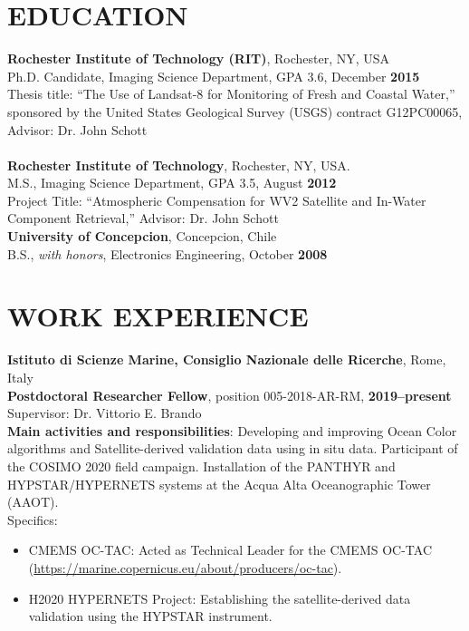\documentclass[11pt]{res}
\begin{document}
\begin{resume}
\vspace{-0.3in}                                         
\section{EDUCATION}
\vspace{0.1in}
{\bf Rochester Institute of Technology (RIT)}, Rochester, NY, USA\\
Ph.D. Candidate, Imaging Science Department, GPA 3.6, December {\bf 2015}\\
Thesis title: ``The Use of Landsat-8 for Monitoring of Fresh and Coastal Water,'' sponsored by the United States Geological Survey (USGS) contract G12PC00065, Advisor: Dr. John Schott\\
\vspace{0.1in}\\
{\bf Rochester Institute of Technology}, Rochester, NY, USA.\\
M.S., Imaging Science Department, GPA 3.5, August {\bf 2012}\\
Project Title: ``Atmospheric Compensation for WV2 Satellite and In-Water Component Retrieval,'' Advisor: Dr. John Schott
\vspace{0.1in}\\
{\bf University of Concepcion}, Concepcion, Chile \\
B.S., {\it with honors}, Electronics Engineering, October {\bf 2008}\\
\vspace{-0.1in}
\section{WORK EXPERIENCE}
\vspace{0.1in}
{\bf Istituto di Scienze Marine, Consiglio Nazionale delle Ricerche}, Rome, Italy\\
{\bf Postdoctoral Researcher Fellow}, position 005-2018-AR-RM, {\bf 2019--present}\\
Supervisor: Dr. Vittorio E. Brando\\
{\bf Main activities and responsibilities}: Developing and improving Ocean Color algorithms and Satellite-derived validation data using in situ data. Participant of the COSIMO 2020 field campaign. Installation of the PANTHYR and HYPSTAR\textsuperscript{\tiny\textregistered}/HYPERNETS systems at the Acqua Alta Oceanographic Tower (AAOT).\\
Specifics:
\begin{itemize}\setlength\itemsep{0em}
\item CMEMS OC-TAC: Acted as Technical Leader for the CMEMS OC-TAC (\url{https://marine.copernicus.eu/about/producers/oc-tac}).
\item H2020 HYPERNETS Project: Establishing the satellite-derived data validation using the HYPSTAR\textsuperscript{\tiny\textregistered} instrument.
\end{itemize}


\end{resume}
\end{document}
